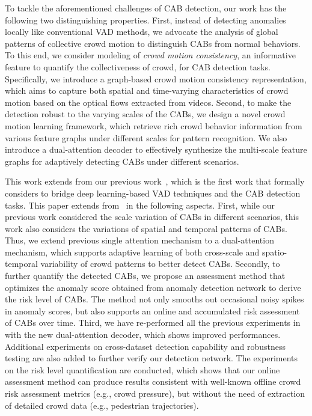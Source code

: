 \documentclass[journal]{IEEEtran}
\begin{document}
\IEEEpubidadjcol

To tackle the aforementioned challenges of CAB detection, our work has the following two distinguishing properties. First, instead of detecting anomalies locally like conventional VAD methods, we advocate the analysis of global patterns of collective crowd motion to distinguish CABs from normal behaviors. To this end, we consider modeling of \textit{crowd motion consistency}, an informative feature to quantify the collectiveness of crowd, for CAB detection tasks. Specifically, we introduce a graph-based crowd motion consistency representation, which aims to capture both spatial and time-varying characteristics of crowd motion based on the optical flows extracted from videos. Second, to make the detection robust to the varying scales of the CABs, we design a novel crowd motion learning framework, which retrieve rich crowd behavior information from various feature graphs under different scales for pattern recognition. We also introduce a dual-attention decoder to effectively synthesize the multi-scale feature graphs for adaptively detecting CABs under different scenarios.

This work extends from our previous work~\cite{luo2023crowd}, which is the first work that formally considers to bridge deep learning-based VAD techniques and the CAB detection tasks. This paper extends from~\cite{luo2023crowd} in the following aspects. First, while our previous work considered the scale variation of CABs in different scenarios, this work also considers the variations of spatial and temporal patterns of CABs. Thus, we extend previous single attention mechanism to a dual-attention mechanism, which supports adaptive learning of both cross-scale and spatio-temporal variability of crowd patterns to better detect CABs. Secondly, to further quantify the detected CABs, we propose an assessment method that optimizes the anomaly score obtained from anomaly detection network to derive the risk level of CABs. The method not only smooths out occasional noisy spikes in anomaly scores, but also supports an online and accumulated risk assessment of CABs over time. Third, we have re-performed all the previous experiments in~\cite{luo2023crowd} with the new dual-attention decoder, which shows improved performances. Additional experiments on cross-dataset detection capability and robustness testing are also added to further verify our detection network. The experiments on the risk level quantification are conducted, which shows that our online assessment method can produce results consistent with well-known offline crowd risk assessment metrics (e.g., crowd pressure), but without the need of extraction of detailed crowd data (e.g., pedestrian trajectories).  
\end{document}
